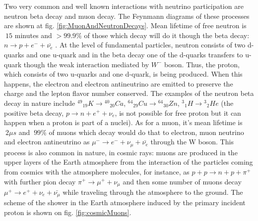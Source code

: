 Two very common and well known interactions with neutrino participation are neutron beta decay and muon decay. The Feynmann diagrams of these processes are shown at fig. \ref{fig:MuonAndNeutronDecays}. Mean lifetime of free neutron is $~15$ minutes and $>99.9\%$ of those which decay will do it though the beta decay: $n \rightarrow p + e^- + \bar{{\nu}_e} $ \cite{ref_PDG}. At the level of fundamental particles, neutron consists of two d-quarks and one u-quark and in the beta decay one of the d-quarks transfers to u-quark though the weak interaction mediated by $W^- $ boson. Thus, the proton, which consists of two u-quarks and one d-quark, is being produced. When this happens, the electron and electron antineutrino are emitted to preserve the charge and the lepton flavor number conserved. The examples of the neutron beta decay in nature include ${^{49}}{_{19}}K \rightarrow {^{40}}{_{20}}Ca$, ${^{64}}{_{29}}Cu \rightarrow {^{64}}{_{30}}Zn$, ${^3}{_1}H \rightarrow {^3}{_2}He$ \cite{ref_Griffiths} (the positive beta decay,  $p \rightarrow n + e^+ + {\nu}_e $, is not possible for free proton but it can happen when a proton is part of a nuclei). As for a muon, it's mean lifetime is $~2 {\mu}s$ and $~99\%$ of muons which decay would do that to electron, muon neutrino and electron antineutrino as ${\mu}^- \rightarrow e^- + {\nu}_{\mu} + \bar{{\nu}_e}$ through the W boson. This process is also common in nature, in cosmic rays: muons are produced in the upper layers of the Earth atmosphere from the interaction of the particles coming from cosmics with the atmosphere molecules, for instance, as $p+p \rightarrow n+p+\pi^+$ with further pion decay $\pi^+ \rightarrow \mu^+ + \nu_\mu$ and then some number of muons decay $\mu^+ \rightarrow e^+ + \nu_e + \bar{\nu_\mu}$ while traveling through the atmosphere to the ground. The scheme of the shower in the Earth atmosphere induced by the primary incident proton is shown on fig. \ref{fig:cosmicMuons}.   

